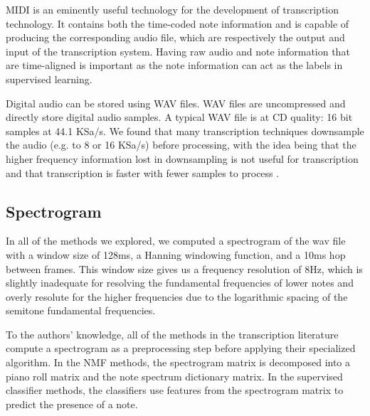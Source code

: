 \documentclass[5p]{elsarticle}
\begin{document}
MIDI is an eminently useful technology for the development of transcription technology. It contains both the time-coded note information and is capable of producing the corresponding audio file, which are respectively the output and input of the transcription system. Having raw audio and note information that are time-aligned is important as the note information can act as the labels in supervised learning.

Digital audio can be stored using WAV files. WAV files are uncompressed and directly store digital audio samples. A typical WAV file is at CD quality: 16 bit samples at 44.1 KSa/s. We found that many transcription techniques downsample the audio (e.g. to 8 or 16 KSa/s) before processing, with the idea being that the higher frequency information lost in downsampling is not useful for transcription and that transcription is faster with fewer samples to process \citet{}.





\subsection{Spectrogram}

In all of the methods we explored, we computed a spectrogram of the wav file with a window size of 128ms, a Hanning windowing function, and a 10ms hop between frames. This window size gives us a frequency resolution of 8Hz, which is slightly inadequate for resolving the fundamental frequencies of lower notes and overly resolute for the higher frequencies due to the logarithmic spacing of the semitone fundamental frequencies.

To the authors' knowledge, all of the methods in the transcription literature compute a spectrogram as a preprocessing step before applying their specialized algorithm. In the NMF methods, the spectrogram matrix is decomposed into a piano roll matrix and the note spectrum dictionary matrix. In the supervised classifier methods, the classifiers use features from the spectrogram matrix to predict the presence of a note.
\end{document}
